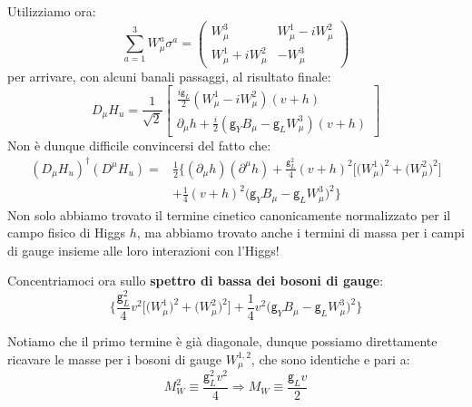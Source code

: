 \documentclass[../main.tex]{subfiles}
\begin{document}
\begin{itemize}
    Utilizziamo ora:
    \begin{equation}
        \boxed{\sum_{a=1}^3 W_\mu^a\sigma^a = 
        \begin{pmatrix}
            W_\mu^3    &     W_\mu^1 - i W_\mu^2 \\
            W_\mu^1 +i W_\mu^2   &  -W_\mu^3
        \end{pmatrix}}
        \label{eq:W^a_gauge_matrixform}
    \end{equation}
    per arrivare, con alcuni banali passaggi, al risultato finale:
    \begin{equation}
        \boxed{D_\mu H_u = \frac{1}{\sqrt2}
        \begin{bmatrix}
            \frac{i\mathsf g_L}{2}(W_\mu^1 - i W_\mu^2)(v+h) \\
            \partial_\mu h +\frac{i}{2}(\mathsf g_Y B_\mu - \mathsf g_L W_\mu^3)(v+h)
        \end{bmatrix}}
        \label{eq:unitary_gauged_higgs_doubl_covariant_derivative}
    \end{equation}
    Non è dunque difficile convincersi del fatto che:
    \begin{equation}
        \boxed{
        \begin{aligned}
            (D_\mu H_u)^\dagger(D^\mu H_u) = &\frac{1}{2}\bigg\{
            (\partial_\mu h)(\partial^\mu h) +\frac{\mathsf g_L^2}{4}(v+h)^2
            \Big[\big(W_\mu^1\big)^2 + \big(W_\mu^2\big)^2\Big]\\
            &+\frac{1}{4}(v+h)^2\big(\mathsf g_Y B_\mu - \mathsf g_L W_\mu^3\big)^2
            \bigg\}
        \end{aligned}
        }
        \label{eq:unitary_gauged_kinetic_term}
    \end{equation}
    Non solo abbiamo trovato il termine cinetico canonicamente normalizzato per il campo fisico di Higgs $h$, ma abbiamo trovato anche i termini di massa per i campi di gauge insieme alle loro interazioni con l'Higgs!
\end{itemize}

Concentriamoci ora sullo \textbf{spettro di bassa dei bosoni di gauge}:
\[
\bigg\{\frac{\mathsf g_L^2}{4}v^2\Big[\big(W_\mu^1\big)^2 + \big(W_\mu^2\big)^2\Big]+\frac{1}{4}v^2 \big(\mathsf g_Y B_\mu - \mathsf g_L W_\mu^3\big)^2\bigg\}
\]

Notiamo che il primo termine è già diagonale, dunque possiamo direttamente ricavare le masse per i bosoni di gauge $W^{1,2}_\mu$, che sono identiche e pari a:
\begin{equation}
    \boxed{M_W^2 \equiv \frac{\mathsf g_L^2v^2}{4} \Rightarrow M_W \equiv \frac{\mathsf g_Lv}{2}}
    \label{eq:W_bosons_mass}
\end{equation}
\end{document}
